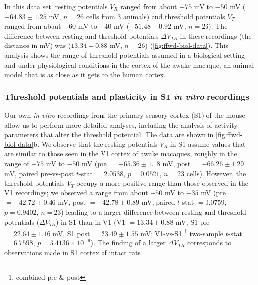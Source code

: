 

In this data set, resting potentials $V_R$ ranged from about $-75$ mV to $-50$ mV
            ($-64.83 \pm 1.25$ mV,
            $n = 26$ cells from 3 animals)
        and threshold potentials $V_T$ ranged from about $-60$ mV to $-40$ mV
            ($-51.48 \pm 0.92$ mV,
            $n = 26$).
    The difference between resting and threshold potentials
        $\Delta V_{TR}$ in these recordings (the distance in mV) was
            ($13.34 \pm 0.88$ mV,
            $n = 26$)
        (\autoref{fig:ffwd-biol-data}).
    This analysis shows the range of threshold potentials assumed
        in a biological setting and under physiological conditions
        in the cortex of the awake macaque,
        an animal model that is as close as it gets to the human cortex.


\subsubsection*{Threshold potentials and plasticity in S1 \textit{in vitro} recordings}

Our own \textit{in vitro} recordings
        from the primary sensory cortex (S1) of the mouse \citep{Gill2020-wy}
        allow us to perform more detailed analyses,
        including the analysis of activity parameters that
        alter the threshold potential.
    The data are shown in \autoref{fig:ffwd-biol-data}b.
    We observe that the resting potentials $V_R$ in S1 assume values
        that are similar to those seen in the V1 cortex of awake macaques,
        roughly in the range of $-75$ mV to $-50$ mV
            (pre $= -65.36 \pm 1.18$ mV,
            post $= -66.26 \pm 1.29$ mV,
            paired pre-vs-post $t$-stat $= 2.0538$,
            $p = 0.0521$,
            $n = 23$ cells).
    However, the threshold potentials $V_T$ occupy
        a more positive range than those observed in the V1 recordings;
        we observed a range from about $-50$ mV to $-35$ mV
            (pre $= -42.72 \pm 0.46$ mV,
            post $= -42.78 \pm 0.89$ mV,
            paired $t$-stat $= 0.0759$,
            $p = 0.9402$,
            $n = 23$)
        leading to a larger difference between resting and threshold potentials
            ($\Delta V_{TR}$) in S1 than in V1
            (V1 $= 13.34 \pm 0.88$ mV,
            S1 pre $= 22.64 \pm 1.16$ mV,
            S1 post $= 23.49 \pm 1.55$ mV;
            V1-vs-S1 \footnote{combined pre \& post} two-sample $t$-stat $= 6.7598$,
            $p = 3.4136 \times 10^{-9}$).
    The finding of a larger $\Delta V_{TR}$ corresponds
        to observations made in S1 cortex of intact rats \citep{Brecht2003-vf}.

